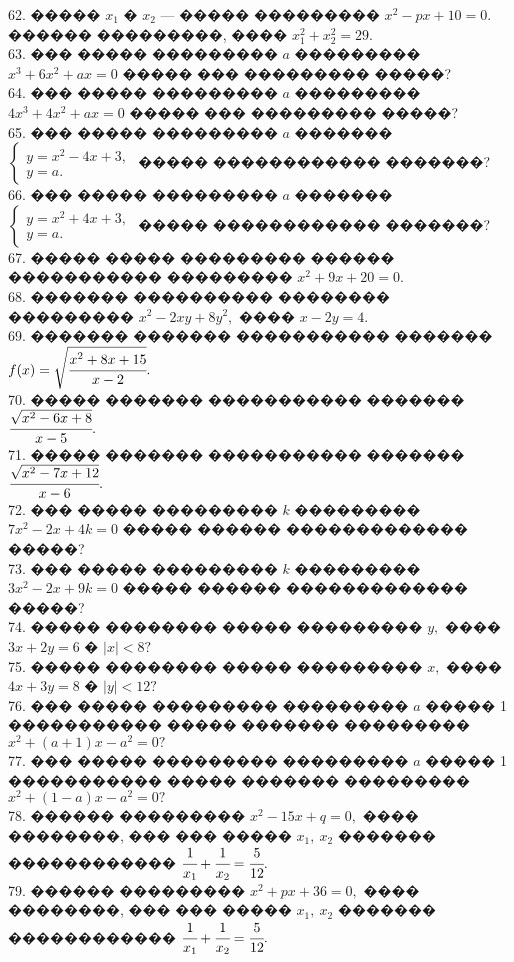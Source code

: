 \documentclass[12pt]{article}
\begin{document}
62. ����� $x_1$ � $x_2$ --- ����� ��������� $x^2-px+10=0.$ ������ ���������, ���� $x_1^2+x_2^2=29.$\\
63. ��� ����� ��������� $a$ ��������� $x^3+6x^2+ax=0$ ����� ��� ��������� �����?\\
64. ��� ����� ��������� $a$ ��������� $4x^3+4x^2+ax=0$ ����� ��� ��������� �����?\\
65. ��� ����� ��������� $a$ ������� $\begin{cases} y=x^2-4x+3,\\ y=a.\end{cases}$ ����� ������������ �������?\\
66. ��� ����� ��������� $a$ ������� $\begin{cases} y=x^2+4x+3,\\ y=a.\end{cases}$ ����� ������������ �������?\\
67. ����� ����� ��������� ������ ����������� ��������� $x^2+9x+20=0.$\\
68. ������� ���������� �������� ��������� $x^2-2xy+8y^2,$ ���� $x-2y=4.$\\
69. ������� ������� ����������� ������� $f(x)=\sqrt{\cfrac{x^2+8x+15}{x-2}}.$\\
70. ����� ������� ����������� ������� $\cfrac{\sqrt{x^2-6x+8}}{x-5}.$\\
71. ����� ������� ����������� ������� $\cfrac{\sqrt{x^2-7x+12}}{x-6}.$\\
72. ��� ����� ��������� $k$ ��������� $7x^2-2x+4k=0$ ����� ������ ������������� �����?\\
73. ��� ����� ��������� $k$ ��������� $3x^2-2x+9k=0$ ����� ������ ������������� �����?\\
74. ����� �������� ����� ��������� $y,$ ���� $3x+2y=6$ � $|x|<8?$\\
75. ����� �������� ����� ��������� $x,$ ���� $4x+3y=8$ � $|y|<12?$\\
76. ��� ����� ��������� ��������� $a$ ����� 1 ����������� ����� ������� ��������� \\$x^2+(a+1)x-a^2=0?$\\
77. ��� ����� ��������� ��������� $a$ ����� 1 ����������� ����� ������� ��������� \\$x^2+(1-a)x-a^2=0?$\\
78. ������ ��������� $x^2-15x+q=0,$ ���� ��������, ��� ��� ����� $x_1,\ x_2$ ������� ������������ $\cfrac{1}{x_1}+\cfrac{1}{x_2}=\cfrac{5}{12}.$\\
79. ������ ��������� $x^2+px+36=0,$ ���� ��������, ��� ��� ����� $x_1,\ x_2$ ������� ������������ $\cfrac{1}{x_1}+\cfrac{1}{x_2}=\cfrac{5}{12}.$\\
\end{document}
